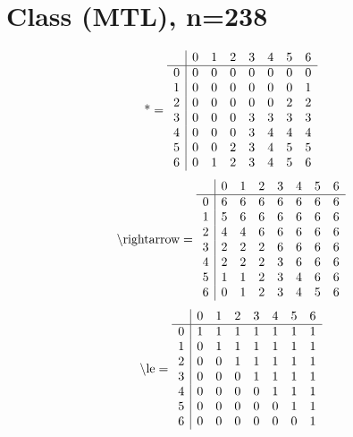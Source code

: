 \documentclass[11pt]{article}
\begin{document}
\section{Class (MTL), n=238}
\[\text{*} = 
\begin{array}{r | r r r r r r r}
 & 0 & 1 & 2 & 3 & 4 & 5 & 6 \\ \hline
0 & 0 & 0 & 0 & 0 & 0 & 0 & 0 \\
1 & 0 & 0 & 0 & 0 & 0 & 0 & 1 \\
2 & 0 & 0 & 0 & 0 & 0 & 2 & 2 \\
3 & 0 & 0 & 0 & 3 & 3 & 3 & 3 \\
4 & 0 & 0 & 0 & 3 & 4 & 4 & 4 \\
5 & 0 & 0 & 2 & 3 & 4 & 5 & 5 \\
6 & 0 & 1 & 2 & 3 & 4 & 5 & 6 \\
\end{array}
\]
\[\text{\textbackslash rightarrow} = 
\begin{array}{r | r r r r r r r}
 & 0 & 1 & 2 & 3 & 4 & 5 & 6 \\ \hline
0 & 6 & 6 & 6 & 6 & 6 & 6 & 6 \\
1 & 5 & 6 & 6 & 6 & 6 & 6 & 6 \\
2 & 4 & 4 & 6 & 6 & 6 & 6 & 6 \\
3 & 2 & 2 & 2 & 6 & 6 & 6 & 6 \\
4 & 2 & 2 & 2 & 3 & 6 & 6 & 6 \\
5 & 1 & 1 & 2 & 3 & 4 & 6 & 6 \\
6 & 0 & 1 & 2 & 3 & 4 & 5 & 6 \\
\end{array}
\]
\[\text{\textbackslash le} = 
\begin{array}{r | r r r r r r r}
 & 0 & 1 & 2 & 3 & 4 & 5 & 6 \\ \hline
0 & 1 & 1 & 1 & 1 & 1 & 1 & 1 \\
1 & 0 & 1 & 1 & 1 & 1 & 1 & 1 \\
2 & 0 & 0 & 1 & 1 & 1 & 1 & 1 \\
3 & 0 & 0 & 0 & 1 & 1 & 1 & 1 \\
4 & 0 & 0 & 0 & 0 & 1 & 1 & 1 \\
5 & 0 & 0 & 0 & 0 & 0 & 1 & 1 \\
6 & 0 & 0 & 0 & 0 & 0 & 0 & 1 \\
\end{array}
\]
\end{document}

